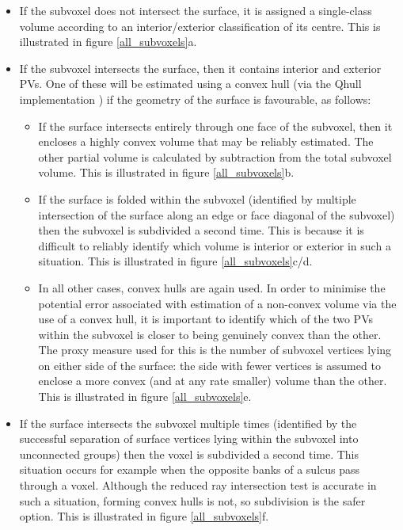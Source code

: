 \begin{itemize}
\item If the subvoxel does not intersect the surface, it is assigned a single-class volume according to an interior/exterior classification of its centre. This is illustrated in figure \ref{all_subvoxels}a. 

\item If the subvoxel intersects the surface, then it contains interior and exterior PVs. One of these will be estimated using a convex hull (via the Qhull implementation \cite{Barber:1996:QAC:235815.235821}) if the geometry of the surface is favourable, as follows:

\begin{itemize}
\item If the surface intersects entirely through one face of the subvoxel, then it encloses a highly convex volume that may be reliably estimated. The other partial volume is calculated by subtraction from the total subvoxel volume. This is illustrated in figure \ref{all_subvoxels}b. 
\item If the surface is folded within the subvoxel (identified by multiple intersection of the surface along an edge or face diagonal of the subvoxel) then the subvoxel is subdivided a second time. This is because it is difficult to reliably identify which volume is interior or exterior in such a situation. This is illustrated in figure \ref{all_subvoxels}c/d. 
\item In all other cases, convex hulls are again used. In order to minimise the potential error associated with estimation of a non-convex volume via the use of a convex hull, it is important to identify which of the two PVs within the subvoxel is closer to being genuinely convex than the other. The proxy measure used for this is the number of subvoxel vertices lying on either side of the surface: the side with fewer vertices is assumed to enclose a more convex (and at any rate smaller) volume than the other. This is illustrated in figure \ref{all_subvoxels}e.
\end{itemize}

\item If the surface intersects the subvoxel multiple times (identified by the successful separation of surface vertices lying within the subvoxel into unconnected groups) then the voxel is subdivided a second time. This situation occurs for example when the opposite banks of a sulcus pass through a voxel. Although the reduced ray intersection test is accurate in such a situation, forming convex hulls is not, so subdivision is the safer option. This is illustrated in figure \ref{all_subvoxels}f. 
\end{itemize}

